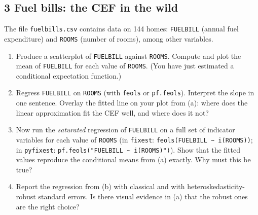 \documentclass[11pt]{article}
\begin{document}
\subsection*{3 Fuel bills: the CEF in the wild}

The file \texttt{fuelbills.csv} contains data on 144 homes: \texttt{FUELBILL} (annual
fuel expenditure) and \texttt{ROOMS} (number of rooms), among other variables.
\begin{enumerate}[label=(\alph*)]
\item Produce a scatterplot of \texttt{FUELBILL} against \texttt{ROOMS}. Compute and plot
the mean of \texttt{FUELBILL} for each value of \texttt{ROOMS}. (You have just estimated
a conditional expectation function.)
\item Regress \texttt{FUELBILL} on \texttt{ROOMS} (with \texttt{feols} or
\texttt{pf.feols}). Interpret the slope in one sentence. Overlay the fitted line on your
plot from (a): where does the linear approximation fit the CEF well, and where does it not?
\item Now run the \emph{saturated} regression of \texttt{FUELBILL} on a full set of
indicator variables for each value of \texttt{ROOMS} (in \texttt{fixest}:
\texttt{feols(FUELBILL \~{} i(ROOMS))}; in \texttt{pyfixest}:
\texttt{pf.feols("FUELBILL \~{} i(ROOMS)")}). Show that the fitted values reproduce the
conditional means from (a) exactly. Why must this be true?
\item Report the regression from (b) with classical and with heteroskedasticity-robust
standard errors. Is there visual evidence in (a) that the robust ones are the right choice?
\end{enumerate}
\end{document}
